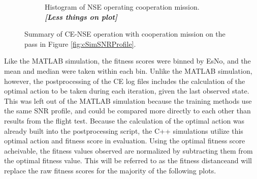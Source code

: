 \begin{figure}[ht]
\begin{subfigure}{\linewidth}
	\caption{Histogram of NSE operating cooperation mission. \textit{\textbf{[Less things on plot]}}}
	\label{fig:cSimNSEHists}
\end{subfigure}
\caption{Summary of CE-NSE operation with cooperation mission on the pass in Figure \ref{fig:cSimSNRProfile}.}
\label{fig:c22NSECoop}
\end{figure}

\par Like the MATLAB simulation, the fitness scores were binned by EsNo, and the mean and median were taken within each bin. Unlike the MATLAB simulation, however, the postprocessing of the CE log files includes the calculation of the optimal action to be taken during each iteration, given the last observed state. This was left out of the MATLAB simulation because the training methods use the same SNR profile, and could be compared more directly to each other than results from the flight test. Because the calculation of the optimal action was already built into the postprocessing script, the C++ simulations utilize this optimal action and fitness score in evaluation. Using the optimal fitness score acheivable, the fitness values observed are normalized by subtracting them from the optimal fitness value. This will be referred to as the fitness distanceand will replace the raw fitness scores for the majority of the following plots.

